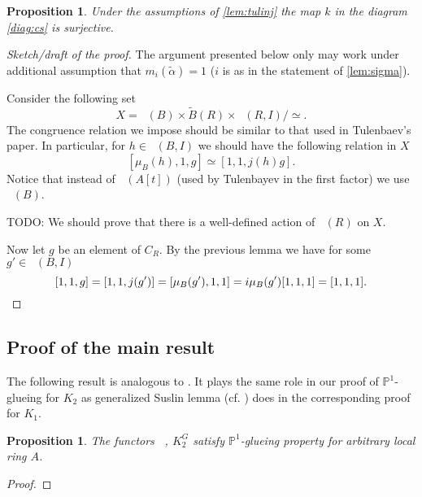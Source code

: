 \documentclass[oneside,12pt]{amsart}
\DeclareRobustCommand{\VAN}[2]{#1}
\numberwithin{equation}{section}
\numberwithin{lem}{section}
\newtheorem{prop}[lem]{Proposition}
\theoremstyle{definition}
\theoremstyle{remark}
\DeclareMathOperator{\St}{St^G}
\newcommand{\Pro}{\mathbb{P}}
\begin{document}
\begin{prop} \label{prop:kersurj} Under the assumptions of \cref{lem:tulinj} the map $k$ in the diagram \eqref{diag:cs} is surjective. \end{prop}
\begin{proof}[Sketch/draft of the proof]
The argument presented below only may work under additional assumption that $m_i(\widetilde{\alpha}) = 1$ ($i$ is as in the statement of \cref{lem:sigma}).

Consider the following set
$$X = \St(B) \times \widetilde{B}(R) \times \St(R, I) /  \simeq.$$
The congruence relation we impose should be similar to that used in Tulenbaev's paper.
In particular, for $h \in \St(B, I)$ we should have the following relation in $X$
$$[\mu_B(h), 1, g] \simeq [1, 1, j(h) g].$$
Notice that instead of $\St(A[t])$ (used by Tulenbayev in the first factor) we use $\St(B)$.

TODO: We should prove that there is a well-defined action of $\St(R)$ on $X$.

Now let $g$ be an element of $C_R$. By the previous lemma we have for some $g' \in \St(B, I)$
\[ [1, 1, g] = [1, 1, j(g')] = [\mu_B(g'), 1, 1] = i\mu_B(g')[1, 1, 1] = [1, 1, 1]. \qedhere \]
\end{proof}


\subsection{Proof of the main result}

The following result is analogous to \cite[Proposition~4.3]{Tu}.
It plays the same role in our proof of $\Pro^1$-glueing for $K_2$ as generalized Suslin lemma (cf. \cite[Theorem~2.16]{Abe}) does in the corresponding proof for $K_1$.
\begin{prop} \label{prop:p1g} The functors $\St$, $K_2^G$ satisfy $\Pro^1$-glueing property for arbitrary local ring $A$.
\end{prop}
\begin{proof}
\end{proof}

\DeclareRobustCommand{\VAN}[2]{#2}
\printbibliography
\end{document}
